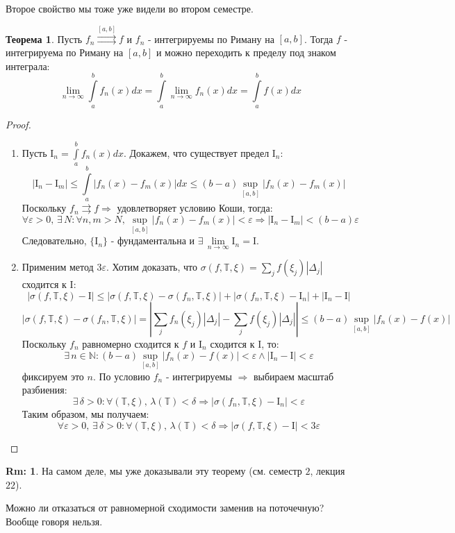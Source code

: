 \documentclass[12pt]{article}
\newcommand{\MN}{\mathbb{N}}
\newcommand{\MTB}{\mathbb{T}}
\newcommand{\MI}{\mathrm{I}}
\newcommand{\VE}{\varepsilon}
\theoremstyle{definition}
\newtheorem{rem}{Rm:}
\newtheorem{theorem}{Теорема}
\newcommand{\ddint}[2]{\displaystyle\int\limits_{#1}^{#2}}
\newcommand{\uconv}[1]{\overset{#1}{\rightrightarrows}}
\begin{document}
Второе свойство мы тоже уже видели во втором семестре.
\begin{theorem}
	Пусть $f_n \uconv{[a,b]} f$ и $f_n$ - интегрируемы по Риману на $[a,b]$. Тогда $f$ - интегрируема по Риману на $[a,b]$ и можно переходить к пределу под знаком интеграла:
	$$
		\lim\limits_{n \to \infty}\ddint{a}{b}f_n(x)dx = \ddint{a}{b}\lim\limits_{n \to \infty}f_n(x)dx = \ddint{a}{b}f(x)dx
	$$
\end{theorem}
\newpage
\begin{proof}\hfill
	\begin{enumerate}[label ={\arabic*)}]
		\item Пусть $\MI_n = \ddint{a}{b}f_n(x)dx$. Докажем, что существует предел $\MI_n$:
		$$
			|\MI_n - \MI_m| \leq \ddint{a}{b}|f_n(x) - f_m(x)|dx \leq (b- a) \sup\limits_{[a,b]}|f_n(x) - f_m(x)|
		$$
		Поскольку $f_n \uconv{} f \Rightarrow$ удовлетворяет условию Коши, тогда:
		$$
			\forall \VE > 0, \, \exists \, N \colon \forall n,m > N, \, \sup\limits_{[a,b]}|f_n(x) - f_m(x)| < \VE \Rightarrow |\MI_n - \MI_m| < (b - a)\VE
		$$
		Следовательно, $\{\MI_n\}$ - фундаментальна и $\exists \, \lim\limits_{n \to \infty}\MI_n = \MI$.
	
		\item Применим метод $3\VE$. Хотим доказать, что $\sigma(f,\MTB,\xi) = \displaystyle\sum\limits_{j}f(\xi_j) |\Delta_j|$ сходится к $\MI$:
		$$
			|\sigma(f, \MTB, \xi) - \MI| \leq |\sigma(f, \MTB, \xi) - \sigma(f_n, \MTB, \xi)| + |\sigma(f_n, \MTB, \xi) - \MI_n| + |\MI_n - \MI|
		$$
		$$
			|\sigma(f, \MTB, \xi) - \sigma(f_n, \MTB, \xi)| = \left|\sum\limits_{j}f_n(\xi_j) |\Delta_j| - \sum\limits_{j}f(\xi_j) |\Delta_j| \right| \leq (b - a)\sup\limits_{[a,b]}|f_n(x) - f(x)|
		$$
		Поскольку $f_n$ равномерно сходится к $f$ и $\MI_n$ сходится к $\MI$, то:
		$$
			\exists \, n \in \MN \colon (b - a)\sup\limits_{[a,b]}|f_n(x) - f(x)|  < \VE \wedge |\MI_n - \MI| < \VE
		$$
		фиксируем это $n$. По условию $f_n$ - интегрируемы $\Rightarrow$ выбираем масштаб разбиения:
		$$
			\exists \, \delta > 0 \colon \forall (\MTB,\xi), \, \lambda(\MTB) < \delta \Rightarrow |\sigma(f_n, \MTB, \xi) - \MI_n| < \VE
		$$
		Таким образом, мы получаем:
		$$
			\forall \VE > 0, \, \exists \, \delta > 0 \colon \forall (\MTB,\xi), \, \lambda(\MTB) < \delta \Rightarrow |\sigma(f, \MTB, \xi) - \MI| < 3\VE
		$$
	\end{enumerate}
	
\end{proof}
\begin{rem}
	На самом деле, мы уже доказывали эту теорему (см. семестр $2$, лекция $22$).
\end{rem}
Можно ли отказаться от равномерной сходимости заменив на поточечную? Вообще говоря нельзя.
\end{document}
